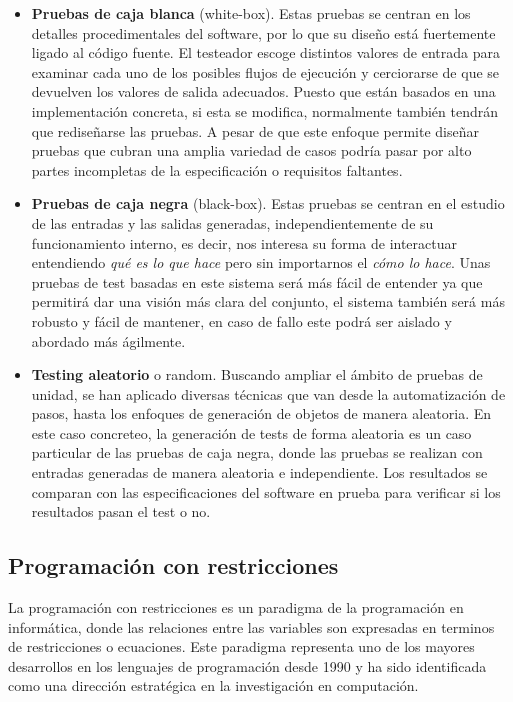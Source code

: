 \begin{itemize}
\item \textbf{Pruebas de caja blanca} (white-box). Estas pruebas se centran en los detalles procedimentales del software, por lo que su dise\~no est\'a fuertemente ligado al c\'odigo fuente. El testeador escoge distintos valores de entrada para examinar cada uno de los posibles flujos de ejecuci\'on y cerciorarse de que se devuelven los valores de salida adecuados. Puesto que est\'an basados en una implementaci\'on concreta, si esta se modifica, normalmente tambi\'en tendr\'an que redise\~narse las pruebas. A pesar de que este enfoque permite dise\~nar pruebas que cubran una amplia variedad de casos podr\'ia pasar por alto partes incompletas de la especificaci\'on o requisitos faltantes.
\item \textbf{Pruebas de caja negra} (black-box). Estas pruebas se centran en el estudio de las entradas y las salidas generadas, independientemente de su funcionamiento interno, es decir, nos interesa su forma de interactuar entendiendo {\it qu\'e es lo que hace} pero sin importarnos el {\it c\'omo lo hace}. Unas pruebas de test basadas en este sistema ser\'a m\'as f\'acil de entender ya que permitir\'a dar una visi\'on m\'as clara del conjunto, el sistema tambi\'en ser\'a m\'as robusto y f\'acil de mantener, en caso de fallo este podr\'a ser aislado y abordado m\'as \'agilmente.
\item \textbf{Testing aleatorio} o random. Buscando ampliar el \'ambito de pruebas de unidad, se han aplicado diversas t\'ecnicas que van desde la automatizaci\'on de pasos, hasta los enfoques de generaci\'on de objetos de manera aleatoria. En este caso concreteo, la generaci\'on de tests de forma aleatoria es un caso particular de las pruebas de caja negra, donde las pruebas se realizan con entradas generadas de manera aleatoria e independiente. Los resultados se comparan con las especificaciones del software en prueba para verificar si los resultados pasan el test o no.
\end{itemize}

\subsection{Programaci\'on con restricciones}

La programaci\'on con restricciones es un paradigma de la programaci\'on en inform\'atica, donde las relaciones entre las variables son expresadas en terminos de restricciones o ecuaciones. Este paradigma representa uno de los mayores desarrollos en los lenguajes de programaci\'on desde 1990 y ha sido identificada como una direcci\'on estrat\'egica en la investigaci\'on en computaci\'on.

